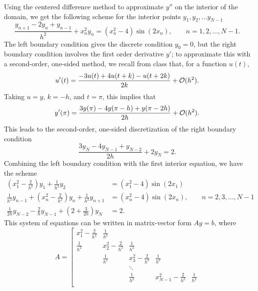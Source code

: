 \documentclass{homework}
\begin{document}
\begin{alphaparts}
		\questionpart Using the centered difference method to approximate $y''$ on the interior of the domain, we get the following scheme for the interior points $y_1, y_2, \dots y_{N-1}$
		\begin{equation*}
			\frac{y_{n+1} - 2y_n + y_{n-1}}{h^2} + x_n^2y_n = (x_n^2- 4)\sin(2x_n), \qquad n = 1, 2, \dots, N-1.
		\end{equation*}
		The left boundary condition gives the discrete condition $y_0 = 0$, but the right boundary condition involves the first order derivative $y'$; to approximate this with a second-order, one-sided method, we recall from class that, for a function $u(t)$,
		\begin{equation*}
			u'(t) = \frac{-3u(t) + 4u(t+k) - u(t+2k)}{2k} + \mathcal{O}(h^2).
		\end{equation*}
		Taking $u = y$, $k = -h$, and $t=\pi$, this implies that
		\begin{equation*}
			y'(\pi) = \frac{3y(\pi) - 4y(\pi - h) + y(\pi - 2h)}{2h} + \mathcal{O}(h^2).
		\end{equation*}
		This leads to the second-order, one-sided discretization of the right boundary condition
		\begin{equation*}
			\frac{3y_N - 4y_{N-1} + y_{N-2}}{2h} + 2y_N = 2.
		\end{equation*}
		Combining the left boundary condition with the first interior equation, we have the scheme
		\begin{align*}
			\left(x_1^2 -\frac{2}{h^2}\right)y_1 + \frac{1}{h^2}y_2 &= (x_1^2-4)\sin(2x_1) \\
			\frac{1}{h^2}y_{n-1} + \left(x_n^2 - \frac{2}{h^2}\right)y_n + \frac{1}{h^2}y_{n+1} &= (x_n^2- 4)\sin(2x_n), \qquad n = 2, 3, \dots, N-1 \\
			\frac{1}{2h}y_{N-2} - \frac{2}{h}y_{N-1} + \left(2 + \frac{3}{2h}\right)y_N &= 2.
		\end{align*}
		This system of equations can be written in matrix-vector form $Ay=b$, where
		\begin{equation*}
			A = \left[\begin{matrix}
				x_1^2 - \frac{2}{h^2} & \frac{1}{h^2} & & \\
				\frac{1}{h^2} & x_2^2 - \frac{2}{h^2} & \frac{1}{h^2} & \\
				& \frac{1}{h^2} & x_3^2 - \frac{2}{h^2} & \frac{1}{h^2} & \\
				& & \ddots & & \\
				& & \frac{1}{h^2} & x_{N-1}^2 - \frac{2}{h^2} & \frac{1}{h^2} \\[0.3em]

\end{matrix}
\end{equation*}
\end{alphaparts}
\end{document}
